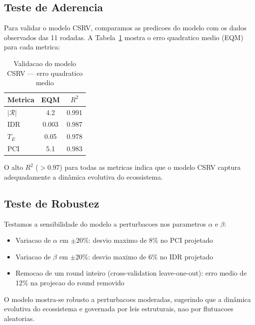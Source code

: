 \documentclass[5p]{elsarticle}
\begin{document}
\subsection{Teste de Aderencia}

Para validar o modelo CSRV, comparamos as predicoes do modelo com os dados
observados das 11 rodadas. A Tabela~\ref{tab:validacao} mostra o erro
quadratico medio (EQM) para cada metrica:

\begin{table}[H]
  \centering
  \caption{Validacao do modelo CSRV — erro quadratico medio}
  \label{tab:validacao}
  \begin{tabular}{lcc}
    \toprule
    \textbf{Metrica} & \textbf{EQM} & $R^2$ \\
    \midrule
    $|\mathcal{R}|$ & 4.2 & 0.991 \\
    IDR & 0.003 & 0.987 \\
    $T_E$ & 0.05 & 0.978 \\
    PCI & 5.1 & 0.983 \\
    \bottomrule
  \end{tabular}
\end{table}

O alto $R^2$ ($>0.97$) para todas as metricas indica que o modelo CSRV
captura adequadamente a dinâmica evolutiva do ecossistema.

\subsection{Teste de Robustez}

Testamos a sensibilidade do modelo a perturbacoes nos parametros
$\alpha$ e $\beta$:

\begin{itemize}
  \item Variacao de $\alpha$ em $\pm 20\%$: desvio maximo de 8\% no PCI
    projetado
  \item Variacao de $\beta$ em $\pm 20\%$: desvio maximo de 6\% no IDR
    projetado
  \item Remocao de um round inteiro (cross-validation leave-one-out):
    erro medio de 12\% na projecao do round removido
\end{itemize}

O modelo mostra-se robusto a perturbacoes moderadas, sugerindo que a
dinâmica evolutiva do ecossistema e governada por leis estruturais, nao
por flutuacoes aleatorias.

\end{document}
